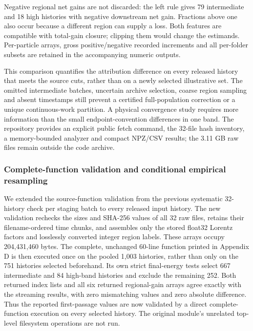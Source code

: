 Negative regional net gains are not discarded: the left rule gives 79
intermediate and 18 high histories with negative downstream net gain.
Fractions above one also occur because a different region can supply a
loss. Both features are compatible with total-gain closure; clipping
them would change the estimands. Per-particle arrays, gross
positive/negative recorded increments and all per-folder subsets are
retained in the accompanying numeric outputs.

This comparison quantifies the attribution difference on every released
history that meets the source cuts, rather than on a newly selected
illustrative set. The omitted intermediate batches, uncertain archive
selection, coarse region sampling and absent timestamps still prevent a
certified full-population correction or a unique continuous-work
partition. A physical convergence study requires more information than
the small endpoint-convention differences in one band. The repository
provides an explicit public fetch command, the 32-file hash inventory, a
memory-bounded analyzer and compact NPZ/CSV results; the 3.11 GB raw
files remain outside the code archive.

\subsubsection{Complete-function validation and conditional empirical
resampling}\label{complete-function-validation-and-conditional-empirical-resampling}

We extended the source-function validation from the previous systematic
32-history check per staging batch to every released input history. The
new validation rechecks the sizes and SHA-256 values of all 32 raw
files, retains their filename-ordered time chunks, and assembles only
the stored float32 Lorentz factors and losslessly converted integer
region labels. These arrays occupy 204,431,460 bytes. The complete,
unchanged 60-line function printed in Appendix D is then executed once
on the pooled 1,003 histories, rather than only on the 751 histories
selected beforehand. Its own strict final-energy tests select 667
intermediate and 84 high-band histories and exclude the remaining 252.
Both returned index lists and all six returned regional-gain arrays
agree exactly with the streaming results, with zero mismatching values
and zero absolute difference. Thus the reported first-passage values are
now validated by a direct complete-function execution on every selected
history. The original module's unrelated top-level filesystem operations
are not run.

